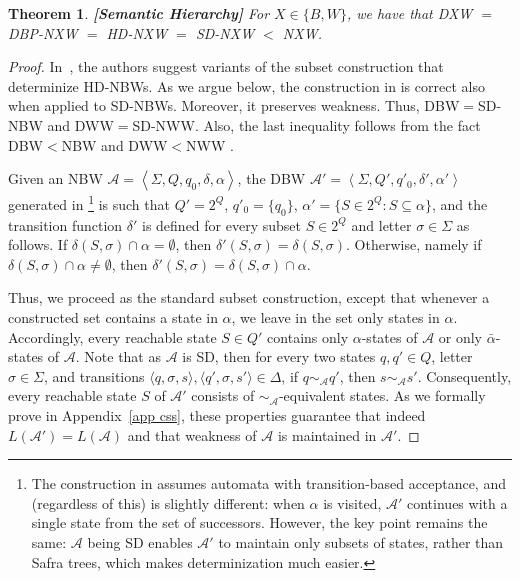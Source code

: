 \documentclass[10pt,a4paper]{amsart}
\newtheorem{thm}{Theorem}[section]
\theoremstyle{definition}
\numberwithin{equation}{section}
\newcommand{\A}{{\mathcal A}}
\newcommand{\zug}[1]{\left\langle #1 \right\rangle}
\begin{document}
\begin{thm}{\bf [Semantic Hierarchy]} 
\label{sem hie}
	For $X \in \{B,W\}$, we have that {\rm DXW} $=$ {\rm DBP-NXW} $=$ {\rm HD-NXW} $=$ {\rm SD-NXW} $<$ {\rm NXW}.
\end{thm}

\begin{proof}
	In~\cite{KSV06,KS15}, the authors suggest variants of the subset construction that determinize HD-NBWs. 
	As we argue below, the construction in \cite{KS15} is correct also when applied to SD-NBWs. Moreover, it preserves weakness.  Thus, DBW$=$SD-NBW and DWW$=$SD-NWW. Also, the last inequality follows from the fact DBW$<$NBW and DWW$<$NWW \cite{Lan69}. 
	
	Given an NBW $\A = \zug{\Sigma, Q, q_0, \delta, \alpha}$, the DBW $\A' = \zug{\Sigma, Q', q'_0, \delta', \alpha'}$ generated in \cite{KS15}\footnote{The construction in \cite{KS15} assumes automata with transition-based acceptance, and (regardless of this) is slightly different: when $\alpha$ is visited, $\A'$ continues with a single state from the set of successors. However, the key point remains the same: $\A$ being SD enables $\A'$ to maintain only subsets of states, rather than Safra trees, which makes determinization much easier.} is such that $Q'=2^Q$, $q'_0= \{q_0\}$, $\alpha' = \{S\in 2^Q: S\subseteq \alpha\}$, and the transition function $\delta'$ is defined for every subset $S\in 2^Q$ and letter $\sigma\in \Sigma$ as follows. If $\delta(S, \sigma)\cap \alpha = \emptyset$, then $\delta'(S, \sigma)=\delta(S, \sigma)$. Otherwise, namely if $\delta(S, \sigma)\cap \alpha \neq \emptyset$, then $\delta'(S, \sigma)=\delta(S, \sigma) \cap \alpha$. 

Thus, we proceed as the standard subset construction, except that whenever a constructed set contains a state in $\alpha$, we leave in the set only states in $\alpha$. Accordingly, every reachable state $S\in Q'$ contains only $\alpha$-states of $\A$ or only $\bar{\alpha}$-states of $\A$. Note that as $\A$ is SD, then for every two states  $q,q' \in Q$, letter $\sigma\in \Sigma$, and transitions $\langle q, \sigma, s\rangle,\langle q', \sigma, s'\rangle \in \Delta$, if $q \sim_{\A} q'$, then $s \sim_{\A} s'$. Consequently, every reachable state $S$ of $\A'$ consists of $\sim_\A$-equivalent states. As we formally prove in Appendix~\ref{app css}, these properties guarantee that indeed $L(\A')=L(\A)$ and that weakness of $\A$ is maintained in $\A'$. 
\end{proof}
\end{document}
